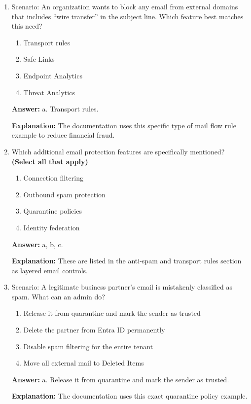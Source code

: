 \documentclass[10pt]{article}
\begin{document}
\begin{enumerate}[leftmargin=*]
\textbf{Explanation:} The documentation explicitly says transport rules are also known as mail flow rules.

\item Scenario: An organization wants to block any email from external domains that includes ``wire transfer'' in the subject line. Which feature best matches this need?
\begin{enumerate}[label=\alph*., leftmargin=1.5em]
\item Transport rules
\item Safe Links
\item Endpoint Analytics
\item Threat Analytics
\end{enumerate}
\textbf{Answer:} a. Transport rules.

\textbf{Explanation:} The documentation uses this specific type of mail flow rule example to reduce financial fraud.

\item Which additional email protection features are specifically mentioned? \textbf{(Select all that apply)}
\begin{enumerate}[label=\alph*., leftmargin=1.5em]
\item Connection filtering
\item Outbound spam protection
\item Quarantine policies
\item Identity federation
\end{enumerate}
\textbf{Answer:} a, b, c.

\textbf{Explanation:} These are listed in the anti-spam and transport rules section as layered email controls.

\item Scenario: A legitimate business partner’s email is mistakenly classified as spam. What can an admin do?
\begin{enumerate}[label=\alph*., leftmargin=1.5em]
\item Release it from quarantine and mark the sender as trusted
\item Delete the partner from Entra ID permanently
\item Disable spam filtering for the entire tenant
\item Move all external mail to Deleted Items
\end{enumerate}
\textbf{Answer:} a. Release it from quarantine and mark the sender as trusted.

\textbf{Explanation:} The documentation uses this exact quarantine policy example.


\end{enumerate}
\end{document}
